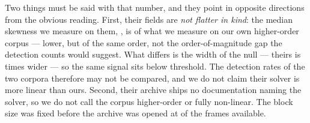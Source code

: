 \documentclass[review]{elsarticle}
\begin{document}
Two things must be said with that number, and they point in opposite directions from
the obvious reading. First, their fields are \emph{not flatter in kind}: the median skewness we measure on
them, \TOneSkewTP{}, is \TOneSkewPct{} of what we measure on our own higher-order
corpus --- lower, but of the same order, not the order-of-magnitude gap the detection
counts would suggest. What differs is the width of the null --- theirs is
\TOneNullRatio{} times wider --- so the same signal sits below threshold. The
detection rates of the two corpora therefore may not be compared, and we do not claim
their solver is more linear than ours. Second, their archive ships no documentation
naming the solver, so we do not call the corpus higher-order or fully non-linear.
The block size was fixed before the archive was opened at \TOneFrameUsed{} of the
\TOneFrames{} frames available.
\end{document}

